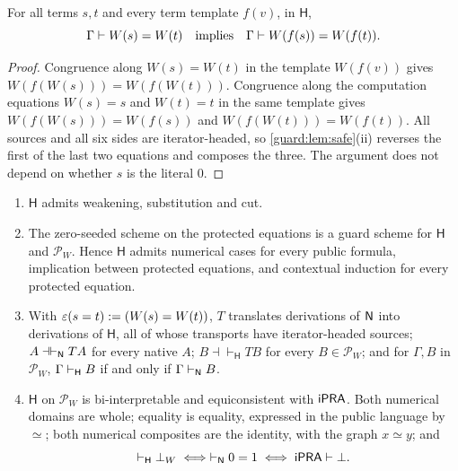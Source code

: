\begin{lemma}
\label{guard:lem:wlift}
For all terms $s,t$ and every term template $f(v)$, in $\mathsf H$,
\[
 \Gamma\vdash W(s)=W(t)\quad\text{implies}\quad
 \Gamma\vdash W(f(s))=W(f(t)).
\]
\end{lemma}

\begin{proof}
Congruence along $W(s)=W(t)$ in the template $W(f(v))$ gives
$W(f(W(s)))=W(f(W(t)))$.  Congruence along the computation equations
$W(s)=s$ and $W(t)=t$ in the same template gives
$W(f(W(s)))=W(f(s))$ and $W(f(W(t)))=W(f(t))$.  All sources and all six
sides are iterator-headed, so \cref{guard:lem:safe}(ii) reverses the first
of the last two equations and composes the three.  The argument does not
depend on whether $s$ is the literal $0$.
\end{proof}

\begin{theorem}
\label{guard:thm:protected}
\begin{enumerate}[label=\textup{(\roman*)}]
\item $\mathsf H$ admits weakening, substitution and cut.
\item The zero-seeded scheme on the protected equations is a guard scheme
 for $\mathsf H$ and $\mathcal P_W$.  Hence $\mathsf H$ admits numerical
 cases for every public formula, implication between protected equations,
 and contextual induction for every protected equation.
\item With $\varepsilon(s=t)\mathrel{:=}(W(s)=W(t))$, $T$ translates derivations
 of $\mathsf{N}$ into derivations of $\mathsf H$, all of whose transports have
 iterator-headed sources; $A\dashv\vdash_{\mathsf{N}}TA$ for every native $A$;
 $B\dashv\vdash_{\mathsf H}TB$ for every $B\in\mathcal P_W$; and for
 $\Gamma,B$ in $\mathcal P_W$, $\Gamma\vdash_{\mathsf H}B$ if and only if
 $\Gamma\vdash_{\mathsf{N}}B$.
\item $\mathsf H$ on $\mathcal P_W$ is bi-interpretable and equiconsistent
 with $\mathsf{iPRA}$.  Both numerical domains are whole; equality is equality,
 expressed in the public language by $\simeq$; both numerical composites
 are the identity, with the graph $x\simeq y$; and
 \[
  \vdash_{\mathsf H}\bot_W\iff\vdash_{\mathsf{N}}0=1\iff\mathsf{iPRA}\vdash\bot .
 \]
\end{enumerate}
\end{theorem}

